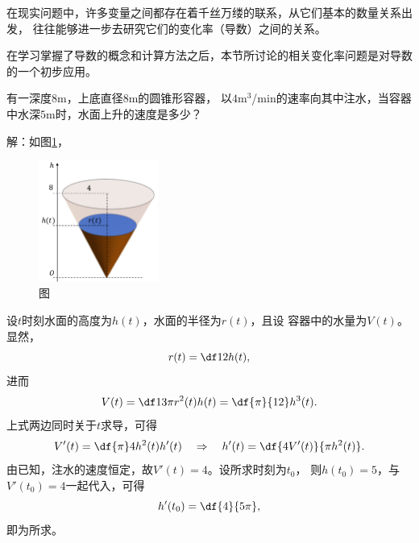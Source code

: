 在现实问题中，许多变量之间都存在着千丝万缕的联系，从它们基本的数量关系出发，
往往能够进一步去研究它们的变化率（导数）之间的关系。

在学习掌握了导数的概念和计算方法之后，本节所讨论的相关变化率问题是对导数
的一个初步应用。

\bs
{}
\egz 有一深度$8$m，上底直径$8$m的圆锥形容器，
以$4$m$^3$/min的速率向其中注水，当容器中水深$5$m时，水面上升的速度是多少？

解：如图\ref{fig:coneFilling}，
\begin{figure}[h]
	\centering
	\includegraphics[width=0.35\textwidth]
	{./Images/Ch02/coneFilling.pdf}
	\caption{\exNo 图}
	\label{fig:coneFilling}
\end{figure}
设$t$时刻水面的高度为$h(t)$，水面的半径为$r(t)$，且设
容器中的水量为$V(t)$。显然，
$$r(t)=\df12h(t),$$
进而
$$V(t)=\df13\pi r^2(t)h(t)=\df{\pi}{12}h^3(t).$$
上式两边同时关于$t$求导，可得
$$V'(t)=\df{\pi}4h^2(t)h'(t)\quad\Rightarrow\quad
h'(t)=\df{4V'(t)}{\pi h^2(t)}.$$
由已知，注水的速度恒定，故$V'(t)=4$。设所求时刻为$t_0$，
则$h(t_0)=5$，与$V'(t_0)=4$一起代入，可得
$$h'(t_0)=\df{4}{5\pi},$$
即为所求。\fin

